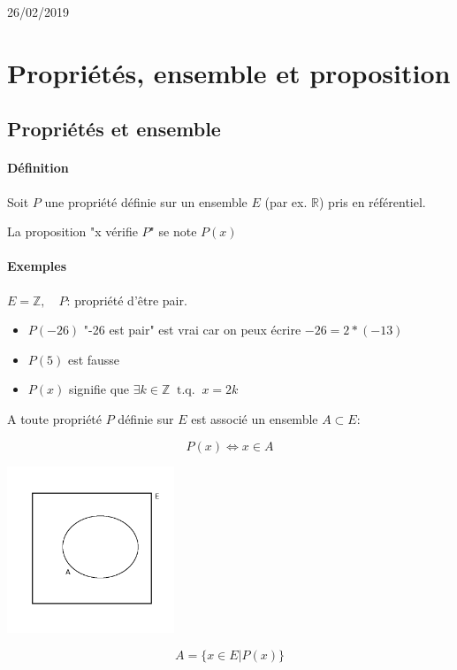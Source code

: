 \documentclass[
    11pt,
    a4paper,
    oneside,
    headinlcude, footinclude,
    twoside,
]{report}
\newcommand{\tq}[0]{\ \textrm{ t.q. }\ }
\newcommand{\markDate}[1]{\begin{flushright}#1\end{flushright}}
\begin{document}
\markDate{26/02/2019}

\section{Propriétés, ensemble et proposition}
\label{sec:proprietes_ensemble_et_proposition}

\subsection{Propriétés et ensemble}
\label{sub:proprietes_et_ensemble}

\paragraph{Définition}
\label{par:definition}

Soit $P$ une propriété définie sur un ensemble $E$ (par ex. $\mathbb{R}$) pris
en référentiel.

La proposition "x vérifie $P$" se note $P(x)$

\paragraph{Exemples}
\label{par:exemples}

$E = \mathbb{Z}, \quad P$: propriété d'être pair.

\begin{itemize}
    \item  $P(-26)$ "-26 est pair" est vrai car on peux écrire $-26 = 2 * (-13)$\
    \item $P(5)$ est fausse
    \item $P(x)$ signifie que $\exists k \in \mathbb{Z} \tq x = 2k$
\end{itemize}

A toute propriété $P$ définie sur $E$ est associé un ensemble $A \subset E$:

$$P(x) \iff x \in A$$

\begin{center}
    \includegraphics[width=5cm]{fig1} 
\end{center}
$$A = \{x \in E | P(x)\}$$
\end{document}
